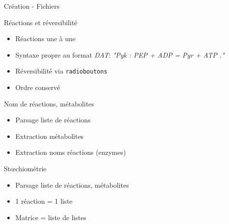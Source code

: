 \documentclass{beamer}
\begin{document}
\begin{frame}{\textcolor{bleu2}{\hspace{1cm}Création - Fichiers}}
\footnotesize
	\begin{center}
		\begin{minipage}[c]{1\textwidth}
			\begin{block}{\hspace{0.2cm}Réactions et réversibilité}
				\begin{itemize}
					\item Réactions une à une
					\item Syntaxe propre au format \emph{DAT}: \emph{"Pyk : PEP + ADP = Pyr + ATP ."}
					\item Réversibilité via \texttt{radioboutons}
					\item Ordre conservé
				\end{itemize}
			\end{block}
			\begin{block}{\hspace{0.2cm}Nom de réactions, métabolites}
				\begin{itemize}
					\item Parsage liste de réactions
					\item Extraction métabolites
					\item Extraction noms réactions (enzymes)
				\end{itemize}
			\end{block}
			\begin{block}{\hspace{0.2cm}Stœchiométrie}
				\begin{itemize}
					\item Parsage liste de réactions, métabolites
					\item 1 réaction = 1 liste
					\item Matrice = liste de listes
				\end{itemize}
			\end{block}
		\end{minipage}
	\end{center}
\end{frame}
\end{document}
